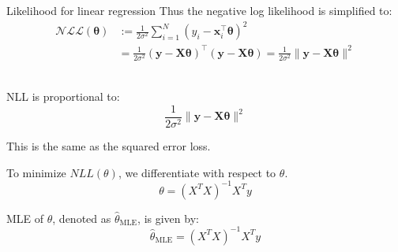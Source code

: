 \documentclass{beamer}
\begin{document}
\begin{frame}{Likelihood for linear regression}
Thus the negative log likelihood is simplified to:
\begin{align*} \mathcal{NLL}(\boldsymbol{\theta}) & :=\frac{1}{2 \sigma^2} \sum_{i=1}^N\left(y_i-\boldsymbol{x}_i^{\top} \boldsymbol{\theta}\right)^2 \\ & =\frac{1}{2 \sigma^2}(\boldsymbol{y}-\boldsymbol{X} \boldsymbol{\theta})^{\top}(\boldsymbol{y}-\boldsymbol{X} \boldsymbol{\theta})=\frac{1}{2 \sigma^2}\|\boldsymbol{y}-\boldsymbol{X} \boldsymbol{\theta}\|^2\end{align*}\\
\pause \begin{tcolorbox}[colback=metropolisblue!5,colframe=metropolisblue,title=Negative Log Likelihood for Linear Regression]     
        NLL is proportional to:
        \begin{equation*}
            \frac{1}{2 \sigma^2}\|\boldsymbol{y}-\boldsymbol{X} \boldsymbol{\theta}\|^2
        \end{equation*}
    \end{tcolorbox}
\pause This is the same as the squared error loss. 
\end{frame}


\begin{frame}
    To minimize $NLL(\theta)$, we differentiate with respect to $\theta$. 
   \pause  \begin{equation}
        \theta = (X^TX)^{-1}X^Ty
    \end{equation}
    \pause \begin{tcolorbox}[colback=metropolisblue!5,colframe=metropolisblue,title=Maximum Likelihood Estimate for $\theta$]
        MLE of $\theta$, denoted as $\hat{\theta}_{\text{MLE}}$, is given by:
        \begin{equation*}
            \hat{\theta}_{\text{MLE}} = (X^TX)^{-1}X^Ty
        \end{equation*}
    \end{tcolorbox}
\end{frame}

    
\end{document}
